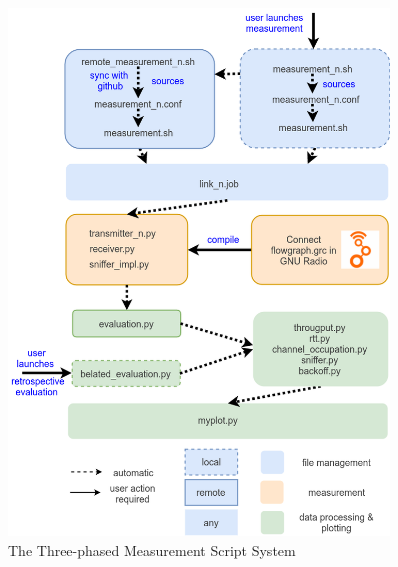 \begin{figure}[ht]
	\label{fig:script-system}
	\begin{center}
		\includegraphics[width=0.9\textwidth]{pictures/script_system}
	\end{center}
	\caption{The Three-phased Measurement Script System}
\end{figure}